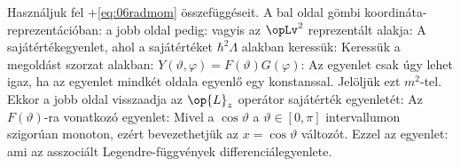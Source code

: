     Használjuk fel \az+\eqref{eq:06radmom} összefüggéseit.
   A bal oldal gömbi koordináta-reprezentációban:
    a jobb oldal pedig:
    vagyis az $\opLv^2$ reprezentált alakja:
    A sajátértékegyenlet, ahol a sajátértéket $\hbar^2\Lambda$ alakban keressük:
    Keressük a megoldást szorzat alakban: $Y(\vartheta,\varphi)=F(\vartheta)G(\varphi)$:
    Az egyenlet csak úgy lehet igaz, ha az egyenlet mindkét oldala egyenlő egy konstanssal.
   Jelöljük ezt $m^2$-tel.
   Ekkor a jobb oldal visszaadja az $\op{L}_z$ operátor sajátérték egyenletét:
    Az $F(\vartheta)$-ra vonatkozó egyenlet:
    Mivel a $\cos\vartheta$ a $\vartheta\in[0,\pi]$ intervallumon szigorúan monoton, ezért bevezethetjük az $x=\cos\vartheta$ változót.
   Ezzel az egyenlet:
    ami az asszociált Legendre-függvények differenciálegyenlete.
    
